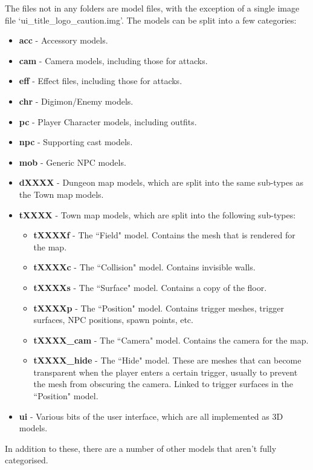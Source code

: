 \documentclass{article}
\begin{document}
The files not in any folders are model files, with the exception of a single image file `ui\_title\_logo\_caution.img'. The models can be split into a few categories:
\begin{itemize}
\item \textbf{acc} - Accessory models.
\item \textbf{cam} - Camera models, including those for attacks.
\item \textbf{eff} - Effect files, including those for attacks.
\item \textbf{chr} - Digimon/Enemy models.
\item \textbf{pc} - Player Character models, including outfits.
\item \textbf{npc} - Supporting cast models.
\item \textbf{mob} - Generic NPC models.
\item \textbf{dXXXX} - Dungeon map models, which are split into the same sub-types as the Town map models.
\item \textbf{tXXXX} - Town map models, which are split into the following sub-types:
\begin{itemize}
	\item \textbf{tXXXXf} - The ``Field" model. Contains the mesh that is rendered for the map.
	\item \textbf{tXXXXc} - The ``Collision" model. Contains invisible walls.
	\item \textbf{tXXXXs} - The ``Surface" model. Contains a copy of the floor.
	\item \textbf{tXXXXp} - The ``Position" model. Contains trigger meshes, trigger surfaces, NPC positions, spawn points, etc.
	\item \textbf{tXXXX\_cam} - The ``Camera" model. Contains the camera for the map.
	\item \textbf{tXXXX\_hide} - The ``Hide" model. These are meshes that can become transparent when the player enters a certain trigger, usually to prevent the mesh from obscuring the camera. Linked to trigger surfaces in the ``Position" model.
\end{itemize}
\item \textbf{ui} - Various bits of the user interface, which are all implemented as 3D models.
\end{itemize}
In addition to these, there are a number of other models that aren't fully categorised.
\end{document}
